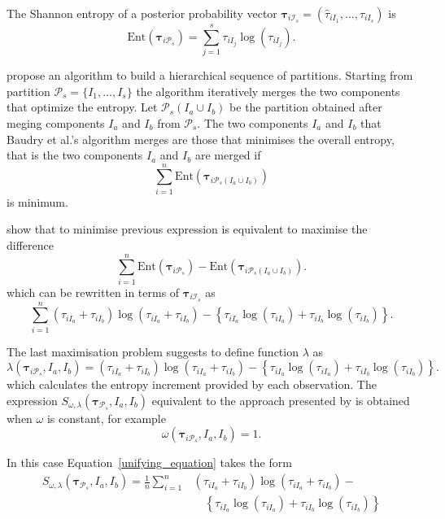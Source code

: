 \documentclass[10pt, a4paper]{article}
\newcommand{\m}[1]{\boldsymbol{#1}}
\begin{document}
\begin{spacing}{1.9}
The Shannon entropy of a posterior probability vector $\m\tau_{i \mathcal{I}_s} = \left( \hat{\tau}_{i I_1} , \dots, \hat{\tau}_{i I_s}  \right)$ is
\[
\text{Ent}( \m\tau_{i \mathcal{P}_s} ) = \sum_{j=1}^s \tau_{i I_j}  \log(\tau_{i I_j} ).
\]


\cite{baudry2010combining} propose an algorithm to build a hierarchical sequence of partitions. Starting from partition $\mathcal{P}_s = \{ I_1, \dots, I_s\}$ the algorithm iteratively merges  the two components that optimize the entropy. Let $\mathcal{P}_s(I_a\cup I_b)$ be the partition obtained after meging components $I_a$ and $I_b$ from $\mathcal{P}_s$. The two components $I_a$ and $I_b$ that Baudry et al.'s algorithm merges are those that minimises the overall entropy, that is the two components $I_a$ and $I_b$ are merged if
\[
\sum_{i=1}^n \text{Ent}( \m\tau_{i \mathcal{P}_s(I_a\cup I_b)} )
\]
is minimum.


\cite{baudry2010combining}  show that to minimise previous expression is equivalent to maximise the difference
\[
\sum_{i=1}^n \text{Ent}( \m\tau_{i \mathcal{P}_s} ) - \text{Ent}( \m\tau_{i \mathcal{P}_s(I_a\cup I_b)} ).
\]
which can be rewritten in terms of $\m\tau_{i \mathcal{I}_s}$ as
\begin{equation}\label{entropy}
\sum_{i=1}^n  (\tau_{iI_a}+\tau_{iI_b}) \log(\tau_{iI_a} + \tau_{iI_b}) - \left\{ \tau_{iI_a} \log(\tau_{iI_a}) + \tau_{iI_b} \log(\tau_{iI_b}) \right\}.
\end{equation}


The last maximisation problem suggests to define function $\lambda$ as
\[
\lambda(\m\tau_{i \mathcal{P}_s},  I_a,  I_b) =  (\tau_{iI_a}+\tau_{iI_b}) \log(\tau_{iI_a} + \tau_{iI_b}) - \left\{ \tau_{iI_a} \log(\tau_{iI_a}) + \tau_{iI_b} \log(\tau_{iI_b}) \right\}.
\]
which calculates the entropy increment provided by each observation. The expression $S_{\omega, \lambda}( \m\tau_{\mathcal{P}_s},  I_a,  I_b) $ equivalent to the approach presented by \cite{baudry2010combining} is obtained when $\omega$ is constant, for example 
\[
\omega(\m\tau_{i \mathcal{P}_s},  I_a,  I_b) = 1.
\]

In this case Equation~\ref{unifying_equation} takes the form
\[
\begin{split}
S_{\omega, \lambda}( \m\tau_{\mathcal{P}_s},  I_a,  I_b) = \frac{1}{n} \sum_{i=1}^n & (\tau_{iI_a}+\tau_{iI_b}) \log(\tau_{iI_a} + \tau_{iI_b}) - \\ 
&\quad \left\{ \tau_{iI_a} \log(\tau_{iI_a}) + \tau_{iI_b} \log(\tau_{iI_b}) \right\}
\end{split}
\]



\end{spacing}
\end{document}

